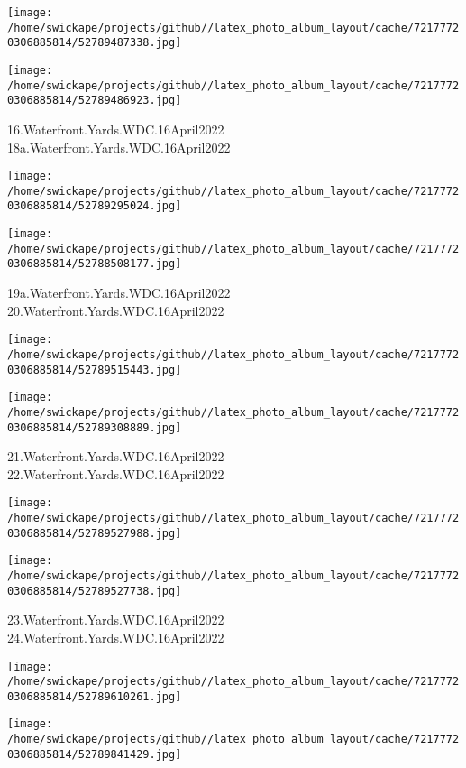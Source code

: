 \documentclass[10pt,letterpaper]{article}
\begin{document}
\texttt{[image: /home/swickape/projects/github//latex\_photo\_album\_layout/cache/72177720306885814/52789487338.jpg]}

\vspace{0.25in}
\texttt{[image: /home/swickape/projects/github//latex\_photo\_album\_layout/cache/72177720306885814/52789486923.jpg]}

16.Waterfront.Yards.WDC.16April2022\\
18a.Waterfront.Yards.WDC.16April2022
\pagebreak

\texttt{[image: /home/swickape/projects/github//latex\_photo\_album\_layout/cache/72177720306885814/52789295024.jpg]}

\vspace{0.25in}
\texttt{[image: /home/swickape/projects/github//latex\_photo\_album\_layout/cache/72177720306885814/52788508177.jpg]}

19a.Waterfront.Yards.WDC.16April2022\\
20.Waterfront.Yards.WDC.16April2022
\pagebreak

\texttt{[image: /home/swickape/projects/github//latex\_photo\_album\_layout/cache/72177720306885814/52789515443.jpg]}

\vspace{0.25in}
\texttt{[image: /home/swickape/projects/github//latex\_photo\_album\_layout/cache/72177720306885814/52789308889.jpg]}

21.Waterfront.Yards.WDC.16April2022\\
22.Waterfront.Yards.WDC.16April2022
\pagebreak

\texttt{[image: /home/swickape/projects/github//latex\_photo\_album\_layout/cache/72177720306885814/52789527988.jpg]}

\vspace{0.25in}
\texttt{[image: /home/swickape/projects/github//latex\_photo\_album\_layout/cache/72177720306885814/52789527738.jpg]}

23.Waterfront.Yards.WDC.16April2022\\
24.Waterfront.Yards.WDC.16April2022
\pagebreak

\texttt{[image: /home/swickape/projects/github//latex\_photo\_album\_layout/cache/72177720306885814/52789610261.jpg]}

\vspace{0.25in}
\texttt{[image: /home/swickape/projects/github//latex\_photo\_album\_layout/cache/72177720306885814/52789841429.jpg]}
\end{document}
